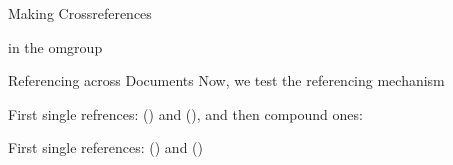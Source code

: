 \begin{omgroup}[id=mcr]{Making Crossreferences}
\begin{omtext} 
 in the omgroup 
\end{omtext} 
\end{omgroup} 
\newpage
\begin{omgroup}[id=rad]{Referencing across Documents}
  Now, we test the referencing mechanism
  \begin{omtext}[title=Internal Referencing]
    First single refrences:  () and  (),
    and then compound ones: 
\end{omtext}
 
\begin{omtext}[title=External Referencing]
  First single references:  () and
   ()
\end{omtext}
\end{omgroup} 
